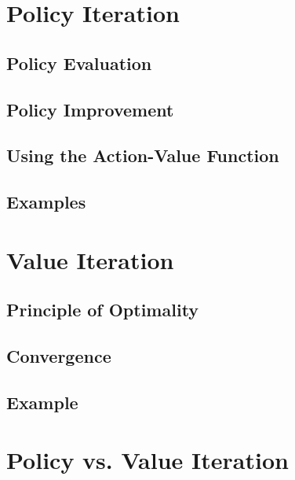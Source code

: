 	\section{Policy Iteration} %

		\subsection{Policy Evaluation} %

		\subsection{Policy Improvement} %

		\subsection{Using the Action-Value Function} %

		\subsection{Examples} %

	\section{Value Iteration} %

		\subsection{Principle of Optimality} %

		\subsection{Convergence} %

		\subsection{Example} %

	\section{Policy vs. Value Iteration} %

